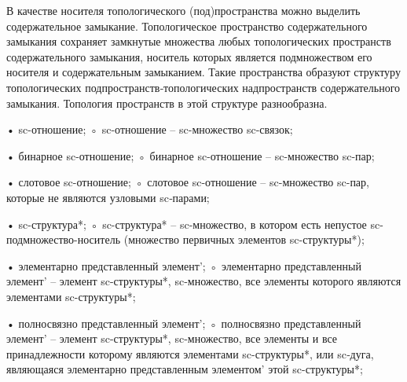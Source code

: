 \begin{SCn}
\end{SCn}
В качестве носителя топологического (под)пространства можно выделить содержательное замыкание. Топологическое пространство содержательного замыкания сохраняет замкнутые множества любых топологических пространств содержательного замыкания, носитель которых является подмножеством его носителя и содержательным замыканием. Такие пространства образуют структуру топологических подпространств‑топологических надпространств содержательного замыкания. Топология пространств в этой структуре разнообразна.

\begin{SCn}
\end{SCn}
• sc-отношение;
◦ sc-отношение – sc-множество sc-связок;

\begin{SCn}
\end{SCn}
• бинарное sc-отношение;
◦ бинарное sc-отношение – sc-множество sc-пар;

\begin{SCn}
\end{SCn}
• слотовое sc-отношение;
◦ слотовое sc-отношение – sc-множество sc-пар, которые не являются узловыми sc‑парами;

\begin{SCn}
\end{SCn}
    • sc-структура*;
◦ sc-структура* – sc-множество, в котором есть непустое sc-подмножество-носитель (множество первичных элементов sc-структуры*);

\begin{SCn}
\end{SCn}
• элементарно представленный элемент’;
◦ элементарно представленный элемент’ – элемент sc-структуры*, sc‑множество, все элементы которого являются элементами sc-структуры*;

\begin{SCn}
\end{SCn}
• полносвязно представленный элемент’;
◦ полносвязно представленный элемент’ – элемент sc-структуры*, sc‑множество, все элементы и все принадлежности которому являются элементами sc-структуры*, или sc‑дуга, являющаяся элементарно представленным элементом’ этой sc-структуры*;


